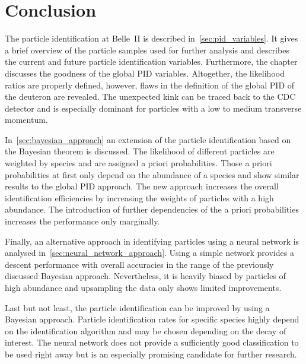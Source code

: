 \chapter{Conclusion}
\label{chap:conclusion}

The particle identification at Belle~\RN{2} is described in~\autoref{sec:pid_variables}. It gives a brief overview of the particle samples used for further analysis and describes the current and future particle identification variables. Furthermore, the chapter discusses the goodness of the global PID variables. Altogether, the likelihood ratios are properly defined, however, flaws in the definition of the global PID of the deuteron are revealed. The unexpected kink can be traced back to the CDC detector and is especially dominant for particles with a low to medium transverse momentum.

In~\autoref{sec:bayesian_approach} an extension of the particle identification based on the Bayesian theorem is discussed. The likelihood of different particles are weighted by species and are assigned a priori probabilities. Those a priori probabilities at first only depend on the abundance of a species and show similar results to the global PID approach. The new approach increases the overall identification efficiencies by increasing the weights of particles with a high abundance. The introduction of further dependencies of the a priori probabilities increases the performance only marginally.

Finally, an alternative approach in identifying particles using a neural network is analysed in~\autoref{sec:neural_network_approach}. Using a simple network provides a descent performance with overall accuracies in the range of the previously discussed Bayesian approach. Nevertheless, it is heavily biased by particles of high abundance and upsampling the data only shows limited improvements.

Last but not least, the particle identification can be improved by using a Bayesian approach. Particle identification rates for specific species highly depend on the identification algorithm and may be chosen depending on the decay of interest. The neural network does not provide a sufficiently good classification to be used right away but is an especially promising candidate for further research.
